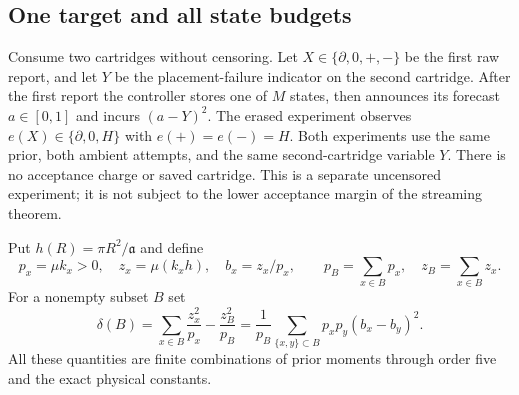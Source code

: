 \documentclass[11pt]{amsart}
\theoremstyle{definition}\newtheorem{definition}[theorem]{Definition}
\theoremstyle{remark}\newtheorem{remark}[theorem]{Remark}
\begin{document}
\subsection{One target and all state budgets}
Consume two cartridges without censoring. Let $X\in\{\partial,0,+,-\}$
be the first raw report, and let $Y$ be the placement-failure indicator
on the second cartridge. After the first report the controller stores
one of $M$ states, then announces its forecast $a\in[0,1]$ and incurs
$(a-Y)^2$. The erased experiment observes
$e(X)\in\{\partial,0,H\}$ with $e(+)=e(-)=H$.
Both experiments use the same prior, both ambient attempts, and the same
second-cartridge variable $Y$. There is no acceptance charge or saved
cartridge. This is a separate uncensored experiment; it is not subject
to the lower acceptance margin of the streaming theorem.

Put $h(R)=\pi R^2/\mathfrak a$ and define
\[
 p_x=\mu k_x>0,\quad z_x=\mu(k_xh),\quad b_x=z_x/p_x,
 \qquad p_B=\sum_{x\in B}p_x,\quad z_B=\sum_{x\in B}z_x.
\]
For a nonempty subset $B$ set
\begin{equation}\label{eq:merge-cost}
 \delta(B)=\sum_{x\in B}\frac{z_x^2}{p_x}-\frac{z_B^2}{p_B}
 =\frac1{p_B}\sum_{\{x,y\}\subset B}p_xp_y(b_x-b_y)^2.
\end{equation}
All these quantities are finite combinations of prior moments through
order five and the exact physical constants.
\end{document}
